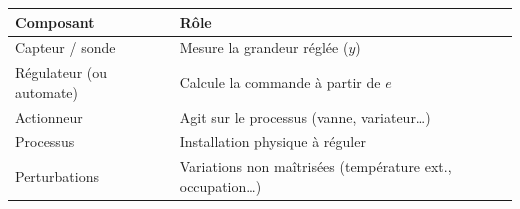 \begin{center}
\begin{tabular}{ll}
  \toprule
  Composant & Rôle \\
  \midrule
  Capteur / sonde & Mesure la grandeur réglée ($y$) \\
  Régulateur (ou automate) & Calcule la commande à partir de $e$ \\
  Actionneur & Agit sur le processus (vanne, variateur\ldots) \\
  Processus & Installation physique à réguler \\
  Perturbations & Variations non maîtrisées (température ext., occupation\ldots) \\
  \bottomrule
\end{tabular}
\end{center}

